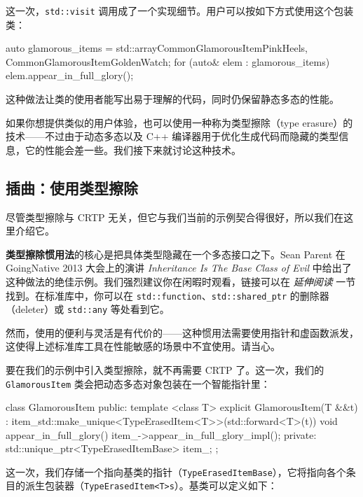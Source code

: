 这一次，\texttt{std::\allowbreak{}visit} 调用成了一个实现细节。用户可以按如下方式使用这个包装类：

\begin{codebox}[cpp]
auto glamorous_items = std::array{CommonGlamorousItem{PinkHeels{}}, CommonGlamorousItem{GoldenWatch{}}};
    for (auto& elem : glamorous_items) {
        elem.appear_in_full_glory();
    }
\end{codebox}

这种做法让类的使用者能写出易于理解的代码，同时仍保留静态多态的性能。

\label{idx:555}
如果你想提供类似的用户体验，也可以使用一种称为类型擦除（type erasure）的技术——不过由于动态多态以及 C++ 编译器用于优化生成代码而隐藏的类型信息，它的性能会差一些。我们接下来就讨论这种技术。

\subsection{插曲：使用类型擦除}

\label{idx:556}
尽管类型擦除与 CRTP 无关，但它与我们当前的示例契合得很好，所以我们在这里介绍它。

\textbf{类型擦除惯用法}的核心是把具体类型隐藏在一个多态接口之下。Sean Parent 在 GoingNative 2013 大会上的演讲 \emph{Inheritance Is The Base Class of Evil} 中给出了这种做法的绝佳示例。我们强烈建议你在闲暇时观看，链接可以在 \emph{延伸阅读} 一节找到。在标准库中，你可以在 \texttt{std::\allowbreak{}function}、\texttt{std::\allowbreak{}shared\_\allowbreak{}ptr} 的删除器（deleter）或 \texttt{std::any} 等处看到它。

然而，使用的便利与灵活是有代价的——这种惯用法需要使用指针和虚函数派发，这使得上述标准库工具在性能敏感的场景中不宜使用。请当心。

\label{idx:557}
要在我们的示例中引入类型擦除，就不再需要 CRTP 了。这一次，我们的 \texttt{Glamorous\allowbreak{}Item} 类会把动态多态对象包装在一个智能指针里：

\begin{codebox}[cpp]
class GlamorousItem {
public:
    template <class T>
    explicit GlamorousItem(T &&t)
        : item_{std::make_unique<TypeErasedItem<T>>(std::forward<T>(t))} {}
    void appear_in_full_glory() {
        item_->appear_in_full_glory_impl();
    }
private:
    std::unique_ptr<TypeErasedItemBase> item_;
};
\end{codebox}

这一次，我们存储一个指向基类的指针（\texttt{Type\allowbreak{}Erased\allowbreak{}Item\allowbreak{}Base}），它将指向各个条目的派生包装器（\texttt{Type\allowbreak{}Erased\allowbreak{}Item<T>s}）。基类可以定义如下：


